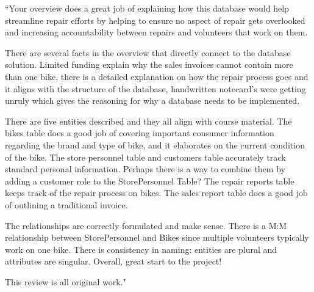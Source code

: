 \documentclass{article}
\begin{document}
\begin{tcolorbox}[colback=secondarycolor, colframe=primarycolor, title=\textbf{Peer Review 1 - Tyler Grzymalski}]
``Your overview does a great job of explaining how this database would help streamline repair efforts by helping to ensure no aspect of repair gets overlooked and increasing accountability between repairs and volunteers that work on them.

\vspace{0.2cm}

There are several facts in the overview that directly connect to the database solution. Limited funding explain why the sales invoices cannot contain more than one bike, there is a detailed explanation on how the repair process goes and it aligns with the structure of the database, handwritten notecard's were getting unruly which gives the reasoning for why a database needs to be implemented.

\vspace{0.2cm}

There are five entities described and they all align with course material. The bikes table does a good job of covering important consumer information regarding the brand and type of bike, and it elaborates on the current condition of the bike. The store personnel table and customers table accurately track standard personal information. Perhaps there is a way to combine them by adding a customer role to the StorePersonnel Table? The repair reports table keeps track of the repair process on bikes. The sales report table does a good job of outlining a traditional invoice.

\vspace{0.2cm}

The relationships are correctly formulated and make sense. There is a M:M relationship between StorePersonnel and Bikes since multiple volunteers typically work on one bike. There is consistency in naming: entities are plural and attributes are singular. Overall, great start to the project!

\vspace{0.2cm}

This review is all original work."
\vspace{0.2cm}
\end{tcolorbox}
\end{document}
